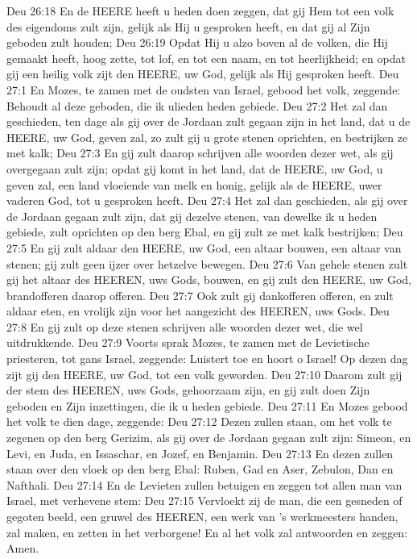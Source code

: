 Deu 26:18  En de HEERE heeft u heden doen zeggen, dat gij Hem tot een volk des eigendoms zult zijn, gelijk als Hij u gesproken heeft, en dat gij al Zijn geboden zult houden;
Deu 26:19  Opdat Hij u alzo boven al de volken, die Hij gemaakt heeft, hoog zette, tot lof, en tot een naam, en tot heerlijkheid; en opdat gij een heilig volk zijt den HEERE, uw God, gelijk als Hij gesproken heeft.
Deu 27:1  En Mozes, te zamen met de oudsten van Israel, gebood het volk, zeggende: Behoudt al deze geboden, die ik ulieden heden gebiede.
Deu 27:2  Het zal dan geschieden, ten dage als gij over de Jordaan zult gegaan zijn in het land, dat u de HEERE, uw God, geven zal, zo zult gij u grote stenen oprichten, en bestrijken ze met kalk;
Deu 27:3  En gij zult daarop schrijven alle woorden dezer wet, als gij overgegaan zult zijn; opdat gij komt in het land, dat de HEERE, uw God, u geven zal, een land vloeiende van melk en honig, gelijk als de HEERE, uwer vaderen God, tot u gesproken heeft.
Deu 27:4  Het zal dan geschieden, als gij over de Jordaan gegaan zult zijn, dat gij dezelve stenen, van dewelke ik u heden gebiede, zult oprichten op den berg Ebal, en gij zult ze met kalk bestrijken;
Deu 27:5  En gij zult aldaar den HEERE, uw God, een altaar bouwen, een altaar van stenen; gij zult geen ijzer over hetzelve bewegen.
Deu 27:6  Van gehele stenen zult gij het altaar des HEEREN, uws Gods, bouwen, en gij zult den HEERE, uw God, brandofferen daarop offeren.
Deu 27:7  Ook zult gij dankofferen offeren, en zult aldaar eten, en vrolijk zijn voor het aangezicht des HEEREN, uws Gods.
Deu 27:8  En gij zult op deze stenen schrijven alle woorden dezer wet, die wel uitdrukkende.
Deu 27:9  Voorts sprak Mozes, te zamen met de Levietische priesteren, tot gans Israel, zeggende: Luistert toe en hoort o Israel! Op dezen dag zijt gij den HEERE, uw God, tot een volk geworden.
Deu 27:10  Daarom zult gij der stem des HEEREN, uws Gods, gehoorzaam zijn, en gij zult doen Zijn geboden en Zijn inzettingen, die ik u heden gebiede.
Deu 27:11  En Mozes gebood het volk te dien dage, zeggende:
Deu 27:12  Dezen zullen staan, om het volk te zegenen op den berg Gerizim, als gij over de Jordaan gegaan zult zijn: Simeon, en Levi, en Juda, en Issaschar, en Jozef, en Benjamin.
Deu 27:13  En dezen zullen staan over den vloek op den berg Ebal: Ruben, Gad en Aser, Zebulon, Dan en Nafthali.
Deu 27:14  En de Levieten zullen betuigen en zeggen tot allen man van Israel, met verhevene stem:
Deu 27:15  Vervloekt zij de man, die een gesneden of gegoten beeld, een gruwel des HEEREN, een werk van 's werkmeesters handen, zal maken, en zetten in het verborgene! En al het volk zal antwoorden en zeggen: Amen.
